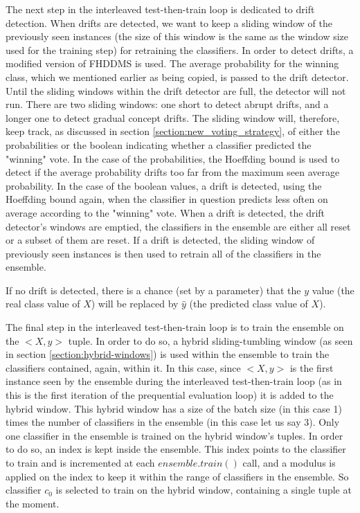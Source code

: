 The next step in the interleaved test-then-train loop is dedicated to drift detection. When drifts are detected, we want to keep a sliding window of the previously seen instances (the size of this window is the same as the window size used for the training step) for retraining the classifiers. In order to detect drifts, a modified version of FHDDMS is used. The average probability for the winning class, which we mentioned earlier as being copied, is passed to the drift detector. Until the sliding windows within the drift detector are full, the detector will not run. There are two sliding windows: one short to detect abrupt drifts, and a longer one to detect gradual concept drifts. The sliding window will, therefore, keep track, as discussed in section \ref{section:new_voting_strategy}, of either the probabilities or the boolean indicating whether a classifier predicted the "winning" vote. In the case of the probabilities, the Hoeffding bound is used to detect if the average probability drifts too far from the maximum seen average probability. In the case of the boolean values, a drift is detected, using the Hoeffding bound again, when the classifier in question predicts less often on average according to the "winning" vote.
When a drift is detected, the drift detector's windows are emptied, the classifiers in the ensemble are either all reset or a subset of them are reset. 
If a drift is detected, the sliding window of previously seen instances is then used to retrain all of the classifiers in the ensemble.

If no drift is detected, there is a chance (set by a parameter) that the $y$ value (the real class value of $X$) will be replaced by $\hat y$ (the predicted class value of $X$).

The final step in the interleaved test-then-train loop is to train the ensemble on the $<X, y>$ tuple. In order to do so, a hybrid sliding-tumbling window (as seen in section \ref{section:hybrid-windows}) is used within the ensemble to train the classifiers contained, again, within it. In this case, since $<X, y>$ is the first instance seen by the ensemble during the interleaved test-then-train loop (as in this is the first iteration of the prequential evaluation loop) it is added to the hybrid window. This hybrid window has a size of the batch size (in this case 1) times the number of classifiers in the ensemble (in this case let us say 3). 
Only one classifier in the ensemble is trained on the hybrid window's tuples. In order to do so, an index is kept inside the ensemble. This index points to the classifier to train and is incremented at each $ensemble.train()$ call, and a modulus is applied on the index to keep it within the range of classifiers in the ensemble.
So classifier $c_0$ is selected to train on the hybrid window, containing a single tuple at the moment.

